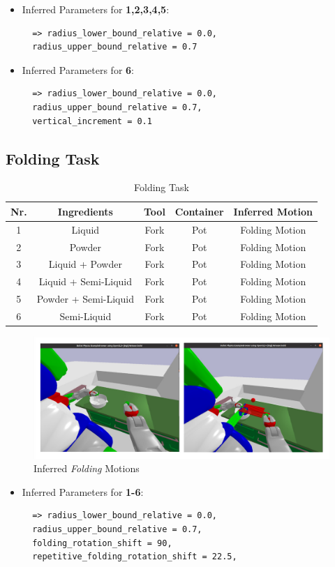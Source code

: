 \begin{itemize}
\item Inferred Parameters for \textbf{1,2,3,4,5}: 
 \begin{lstlisting}
  => radius_lower_bound_relative = 0.0, 
  radius_upper_bound_relative = 0.7
\end{lstlisting}
\item Inferred Parameters for \textbf{6}:
\begin{lstlisting}
  => radius_lower_bound_relative = 0.0, 
  radius_upper_bound_relative = 0.7,
  vertical_increment = 0.1
\end{lstlisting}
\end{itemize}

\subsection{Folding Task}
\begin{table}[H]
  \centering
  \begin{tabular}{|c|c|c|c|c|}
    \hline
    \textbf{Nr.} & \textbf{Ingredients} & \textbf{Tool} & \textbf{Container} & \textbf{Inferred Motion}  \\
    \hline
    1 & Liquid & Fork & Pot & Folding Motion \\
    \hline
    2 & Powder & Fork & Pot & Folding Motion \\
    \hline
    3 & Liquid + Powder & Fork & Pot & Folding Motion \\
    \hline
    4 & Liquid + Semi-Liquid & Fork & Pot & Folding Motion \\
    \hline
    5 & Powder + Semi-Liquid & Fork & Pot & Folding Motion \\
    \hline
    6 & Semi-Liquid & Fork & Pot & Folding Motion \\
    \hline
  \end{tabular}
  \caption{Folding Task}
  \label{tab:mixingtask}
\end{table}
\begin{figure}[H]
  \includegraphics[scale=0.25]{Graphics/folding_evaluation.jpg}
  \caption{Inferred \textit{Folding} Motions}
  \label{fig:mixingverb WikiHow}
\end{figure}
\begin{itemize}
\item Inferred Parameters for \textbf{1-6}: 
 \begin{lstlisting}
  => radius_lower_bound_relative = 0.0, 
  radius_upper_bound_relative = 0.7,
  folding_rotation_shift = 90, 
  repetitive_folding_rotation_shift = 22.5,
\end{lstlisting}
\end{itemize}